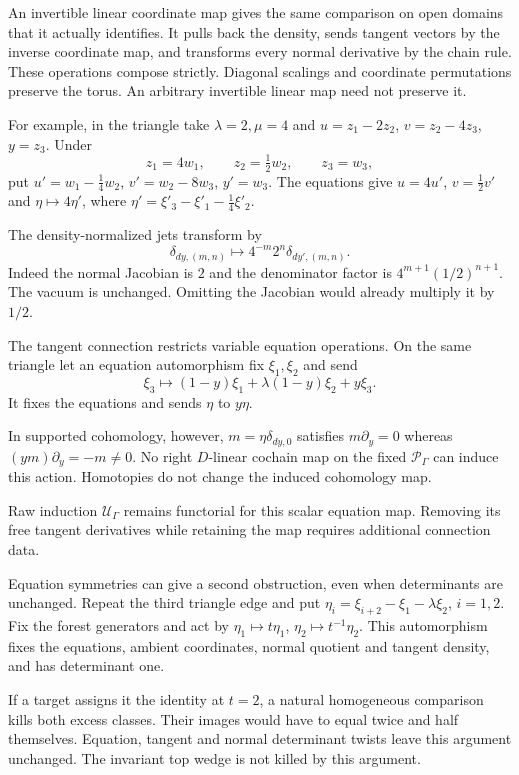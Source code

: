 An invertible linear coordinate map gives the same comparison
on open domains that it actually identifies. It pulls back the
density, sends tangent vectors by the inverse coordinate map,
and transforms every normal derivative by the chain rule.
These operations compose strictly. Diagonal scalings and
coordinate permutations preserve the torus. An arbitrary
invertible linear map need not preserve it.

For example, in the triangle take $\lambda=2,\mu=4$ and
$u=z_1-2z_2$, $v=z_2-4z_3$, $y=z_3$. Under
\[
 z_1=4w_1,\qquad z_2=\tfrac12 w_2,\qquad z_3=w_3,
\]
put $u'=w_1-\tfrac14w_2$, $v'=w_2-8w_3$, $y'=w_3$.
The equations give $u=4u'$, $v=\tfrac12v'$ and
$\eta\mapsto4\eta'$, where
$\eta'=\xi'_3-\xi'_1-\tfrac14\xi'_2$.

The density-normalized jets transform by
\[
 \delta_{dy,(m,n)}\longmapsto4^{-m}2^n\delta_{dy',(m,n)}.
\]
Indeed the normal Jacobian is $2$ and the denominator factor
is $4^{m+1}(1/2)^{n+1}$. The vacuum is unchanged. Omitting
the Jacobian would already multiply it by $1/2$.

The tangent connection restricts variable equation operations.
On the same triangle let an equation automorphism fix
$\xi_1,\xi_2$ and send
\[
 \xi_3\longmapsto(1-y)\xi_1+\lambda(1-y)\xi_2+y\xi_3.
\]
It fixes the equations and sends $\eta$ to $y\eta$.

In supported cohomology, however,
$m=\eta\delta_{dy,0}$ satisfies $m\partial_y=0$ whereas
$(ym)\partial_y=-m\ne0$. No right $D$-linear cochain map on
the fixed $\mathcal P_\Gamma$ can induce this action.
Homotopies do not change the induced cohomology map.

Raw induction $\mathcal U_\Gamma$ remains functorial for this
scalar equation map. Removing its free tangent derivatives
while retaining the map requires additional connection data.

Equation symmetries can give a second obstruction, even when
determinants are unchanged. Repeat the third triangle edge and
put
$\eta_i=\xi_{i+2}-\xi_1-\lambda\xi_2$, $i=1,2$.
Fix the forest generators and act by
$\eta_1\mapsto t\eta_1$, $\eta_2\mapsto t^{-1}\eta_2$.
This automorphism fixes the equations, ambient coordinates,
normal quotient and tangent density, and has determinant one.

If a target assigns it the identity at $t=2$, a natural
homogeneous comparison kills both excess classes.
Their images would have to equal twice and half themselves.
Equation, tangent and normal determinant twists leave this
argument unchanged. The invariant top wedge is not killed
by this argument.

